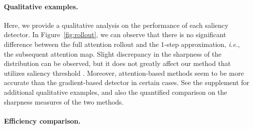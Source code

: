 \documentclass{article}
\begin{document}
\paragraph{Qualitative examples.}
\vspace{-3mm}
Here, we provide a qualitative analysis on the performance of each saliency detector.
In Figure~\ref{fig:rollout}, we can observe that there is no significant difference between the full attention rollout and the 1-step approximation, \textit{i.e.}, the subsequent attention map.
Slight discrepancy in the sharpness of the distribution can be observed, but it does not greatly affect our method that utilizes saliency threshold .
Moreover, attention-based methods seem to be more accurate than the gradient-based detector in certain cases.
See the supplement for additional qualitative examples, and also the quantified comparison on the sharpness measures of the two methods.
\paragraph{Efficiency comparison.}
\end{document}
